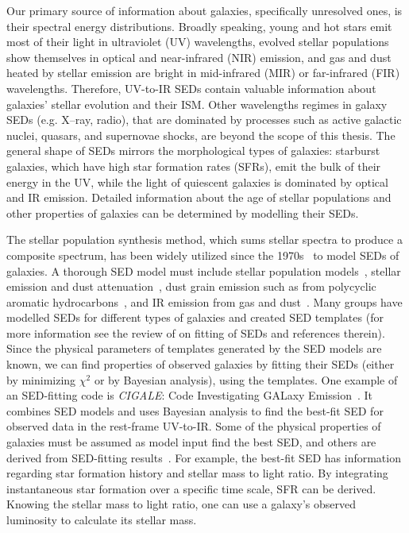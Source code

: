 Our primary source of information about galaxies, specifically unresolved ones, is their spectral energy distributions. 
Broadly speaking, young and hot stars emit most of their light in ultraviolet (UV) wavelengths, evolved stellar populations show themselves in optical and near-infrared (NIR) emission, and gas and dust heated by stellar emission are bright in mid-infrared (MIR) or far-infrared (FIR) wavelengths.
Therefore, UV-to-IR SEDs contain valuable information about galaxies' stellar evolution and their ISM. 
Other wavelengths regimes in galaxy SEDs (e.g. X--ray, radio), that are dominated by processes such as active galactic nuclei, quasars, and supernovae shocks, are beyond the scope of this thesis.
The general shape of SEDs mirrors the morphological types of galaxies: starburst galaxies, which have high star formation rates (SFRs), emit the bulk of their energy in the UV, while the light of quiescent galaxies is dominated by optical and IR emission. 
Detailed information about the age of stellar populations and other properties of galaxies can be determined by modelling their SEDs.

The stellar population synthesis method, which sums stellar spectra to produce a composite spectrum, has been widely utilized since the 1970s~\citep[e.g.][]{Tinsley72,Searle73} to model SEDs of galaxies.
A thorough SED model must include stellar population models~\citep[e.g.][]{Bruzual93,Bruzual03,Maraston05}, stellar emission and dust attenuation~\citep[e.g.][]{Calzetti00,Dopita05}, dust grain emission such as from polycyclic aromatic hydrocarbons~\citep[PAHs; e.g.][and references therein]{Tielens08}, and IR emission from gas and dust~\citep[e.g.][]{Chary01,Dale02,Lagache03,Lagache04,Smith07a,Draine07}.
Many groups have modelled SEDs for different types of galaxies and created SED templates (for more information see the review of \cite{Walcher11} on fitting of SEDs and references therein).
Since the physical parameters of templates generated by the SED models are known, we can find properties of observed galaxies by fitting their SEDs (either by minimizing $\chi^2$ or by Bayesian analysis), using the templates.
One example of an SED-fitting code is {\em CIGALE}: Code Investigating GALaxy Emission~\citep{Noll09}.
It combines SED models and uses Bayesian analysis to find the best-fit SED for observed data in the rest-frame UV-to-IR.
Some of the physical properties of galaxies must be assumed as model input find the best SED, and others are derived from SED-fitting results~\citep[see][for more detail]{Walcher08}.
For example, the best-fit SED has information regarding star formation history and stellar mass to light ratio.
By integrating instantaneous star formation over a specific time scale, SFR can be derived.
Knowing the stellar mass to light ratio, one can use a galaxy's observed luminosity to calculate its stellar mass.

